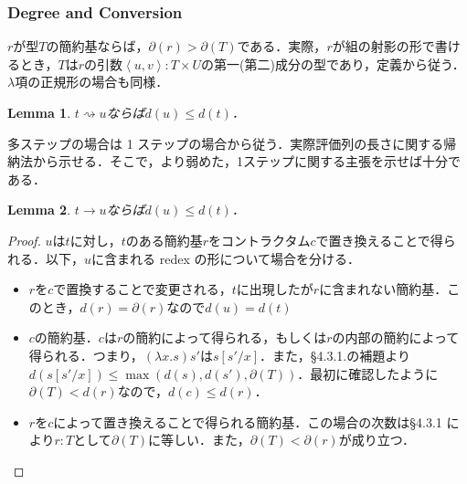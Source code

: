 \documentclass[a4paper,10pt,platex, dvipdfmx]{jsarticle}
\newtheorem{lemma}{Lemma}
\begin{document}
\subsubsection{Degree and Conversion}
$r$が型$T$の簡約基ならば，$\partial(r) > \partial(T)$である．実際，$r$が組の射影の形で書けるとき，$T$は$r$の引数$\left<u, v\right>: T\times U$の第一(第二)成分の型であり，定義から従う．$\lambda$項の正規形の場合も同様．

\begin{lemma}
$t\rightsquigarrow u$ならば$d(u)\leq d(t)$．
\end{lemma}
多ステップの場合は 1 ステップの場合から従う．実際評価列の長さに関する帰納法から示せる．そこで，より弱めた，1ステップに関する主張を示せば十分である．
\begin{lemma}
$t\rightarrow u$ならば$d(u)\leq d(t)$．
\end{lemma}
\begin{proof}
$u$は$t$に対し，$t$のある簡約基$r$をコントラクタム$c$で置き換えることで得られる．以下，$u$に含まれる redex の形について場合を分ける．\begin{itemize}
\item $r$を$c$で置換することで変更される，$t$に出現したが$r$に含まれない簡約基．このとき，$d(r) = \partial(r)$なので$d(u) = d(t)$
\item $c$の簡約基．$c$は$r$の簡約によって得られる，もしくは$r$の内部の簡約によって得られる．つまり，$(\lambda x. s)s'$は$s\left[s'/x\right]$．また，\S4.3.1.の補題より$d(s\left[s'/x\right])\leq \max(d(s), d(s'), \partial(T))$．最初に確認したように$\partial(T) < d(r)$なので，$d(c) \leq d(r)$．
\item $r$を$c$によって置き換えることで得られる簡約基．この場合の次数は\S4.3.1 により$r :T$として$\partial(T)$に等しい．また，$\partial(T) < \partial(r)$が成り立つ．
\end{itemize}
\end{proof}
\end{document}
